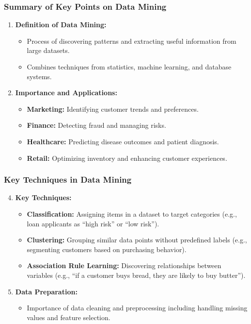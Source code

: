 \documentclass[aspectratio=169]{beamer}
\begin{document}
\begin{frame}[fragile]
    \frametitle{Summary of Key Points on Data Mining}
    
    \begin{enumerate}
        \item \textbf{Definition of Data Mining:}
        \begin{itemize}
            \item Process of discovering patterns and extracting useful information from large datasets.
            \item Combines techniques from statistics, machine learning, and database systems.
        \end{itemize}
        
        \item \textbf{Importance and Applications:}
        \begin{itemize}
            \item \textbf{Marketing:} Identifying customer trends and preferences.
            \item \textbf{Finance:} Detecting fraud and managing risks.
            \item \textbf{Healthcare:} Predicting disease outcomes and patient diagnosis.
            \item \textbf{Retail:} Optimizing inventory and enhancing customer experiences.
        \end{itemize}
    \end{enumerate}
\end{frame}

\begin{frame}[fragile]
    \frametitle{Key Techniques in Data Mining}
    
    \begin{enumerate}
        \setcounter{enumi}{3} %
        \item \textbf{Key Techniques:}
        \begin{itemize}
            \item \textbf{Classification:} Assigning items in a dataset to target categories (e.g., loan applicants as “high risk” or “low risk”).
            \item \textbf{Clustering:} Grouping similar data points without predefined labels (e.g., segmenting customers based on purchasing behavior).
            \item \textbf{Association Rule Learning:} Discovering relationships between variables (e.g., “if a customer buys bread, they are likely to buy butter”).
        \end{itemize}
        
        \item \textbf{Data Preparation:}
        \begin{itemize}
            \item Importance of data cleaning and preprocessing including handling missing values and feature selection.
        \end{itemize}
    \end{enumerate}
\end{frame}
\end{document}
